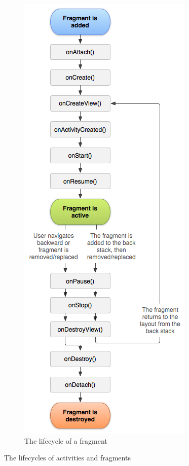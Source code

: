 \begin{figure}[H]
\begin{subfigure}[b]{0.3\textwidth}
      \centering
      \includegraphics[width=\linewidth]{images/fragment_lifecycle.png}
      \caption[The lifecycle of a fragment \protect{}]{The lifecycle of a fragment}
    \label{fig:fragment_lifecycle}
    \end{subfigure}
  \caption{The lifecycles of activities and fragments}
\end{figure}

